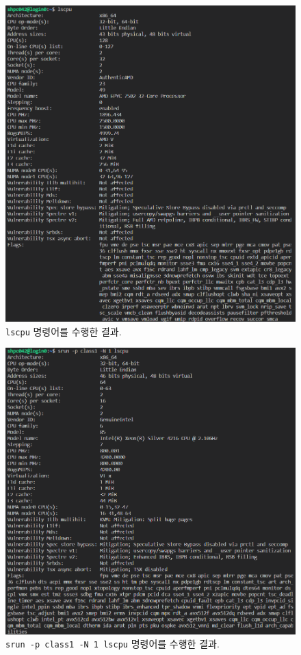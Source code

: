 \begin{enumerate}[label= (\alph*)]
{        \begin{figure}
            \centering
            \includegraphics[width=\textwidth]{imgs/Figure09_lscpu.png}
            \caption{\label{fig:3-4}
                \texttt{lscpu} 명령어를 수행한 결과.
            }
        \end{figure}

        \begin{figure}
            \centering
            \includegraphics[width=\textwidth]{imgs/Figure10_srun_lscpu.png}
            \caption{\label{fig:3-5}
                \texttt{srun -p class1 -N 1 lscpu} 명령어를 수행한 결과.
            }
        \end{figure}
    }

\end{enumerate}
